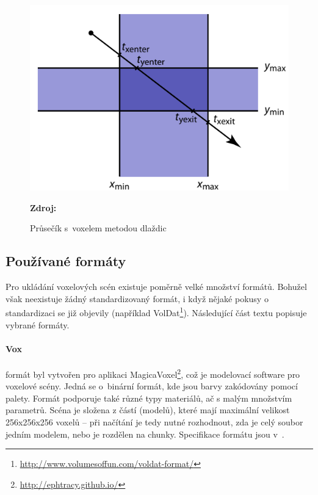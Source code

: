 \begin{figure}[H]
	\centering
	\includegraphics[scale=1.3]{obrazky-figures/slab_intersect.png}
	\caption{Průsečík s~voxelem metodou dlaždic}
	\textbf{Zdroj: \cite{Cunha13}}
	\label{fig:slabs}
\end{figure}


\subsection{Používané formáty} \label{sec:format}
Pro ukládání voxelových scén existuje poměrně velké množství formátů. Bohužel však neexistuje žádný standardizovaný formát, i když nějaké pokusy o standardizaci se již objevily (například VolDat\footnote{\url{http://www.volumesoffun.com/voldat-format/}}). Následující část textu popisuje vybrané formáty.

\paragraph{Vox} formát byl vytvořen pro aplikaci MagicaVoxel\footnote{\url{http://ephtracy.github.io/}}, což je modelovací software pro voxelové scény. Jedná se o~binární formát, kde jsou barvy zakódovány pomocí palety. Formát podporuje také různé typy materiálů, ač s malým množstvím parametrů. Scéna je složena z částí (modelů), které mají maximální velikost 256x256x256 voxelů -- při načítání je tedy nutné rozhodnout, zda je celý soubor jedním modelem, nebo je rozdělen na chunky. Specifikace formátu jsou v~\cite{vox_format}.

